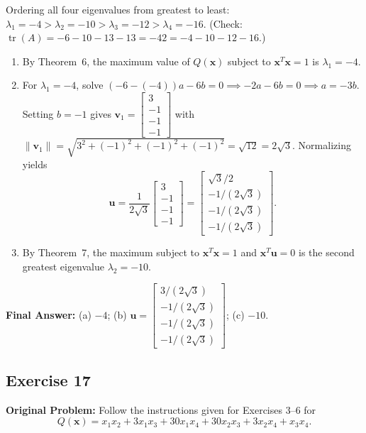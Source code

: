 \documentclass[11pt, letterpaper]{article}
\theoremstyle{definition}
\theoremstyle{remark}
\begin{document}
Ordering all four eigenvalues from greatest to least: $\lambda_1 = -4 > \lambda_2 = -10 > \lambda_3 = -12 > \lambda_4 = -16$. (Check: $\operatorname{tr}(A) = -6 - 10 - 13 - 13 = -42 = -4 - 10 - 12 - 16$.)

\begin{enumerate}[label=(\alph*)]
    \item By Theorem~6, the maximum value of $Q(\mathbf{x})$ subject to $\mathbf{x}^T \mathbf{x} = 1$ is $\lambda_1 = -4$.
    \item For $\lambda_1 = -4$, solve $(-6 - (-4))a - 6b = 0 \implies -2a - 6b = 0 \implies a = -3b$. Setting $b = -1$ gives $\mathbf{v}_1 = \begin{bmatrix} 3 \\ -1 \\ -1 \\ -1 \end{bmatrix}$ with $\|\mathbf{v}_1\| = \sqrt{3^2 + (-1)^2 + (-1)^2 + (-1)^2} = \sqrt{12} = 2\sqrt{3}$. Normalizing yields
    \[
    \mathbf{u} = \frac{1}{2\sqrt{3}}\begin{bmatrix} 3 \\ -1 \\ -1 \\ -1 \end{bmatrix} = \begin{bmatrix} \sqrt{3}/2 \\ -1/(2\sqrt{3}) \\ -1/(2\sqrt{3}) \\ -1/(2\sqrt{3}) \end{bmatrix}.
    \]
    \item By Theorem~7, the maximum subject to $\mathbf{x}^T \mathbf{x} = 1$ and $\mathbf{x}^T \mathbf{u} = 0$ is the second greatest eigenvalue $\lambda_2 = -10$.
\end{enumerate}

\textbf{Final Answer:} (a) $-4$; (b) $\mathbf{u} = \begin{bmatrix} 3/(2\sqrt{3}) \\ -1/(2\sqrt{3}) \\ -1/(2\sqrt{3}) \\ -1/(2\sqrt{3}) \end{bmatrix}$; (c) $-10$.

\subsection{Exercise 17}
\textbf{Original Problem:} Follow the instructions given for Exercises 3–6 for
\[
Q(\mathbf{x}) = x_1x_2 + 3x_1x_3 + 30x_1x_4 + 30x_2x_3 + 3x_2x_4 + x_3x_4.
\]
\end{document}
